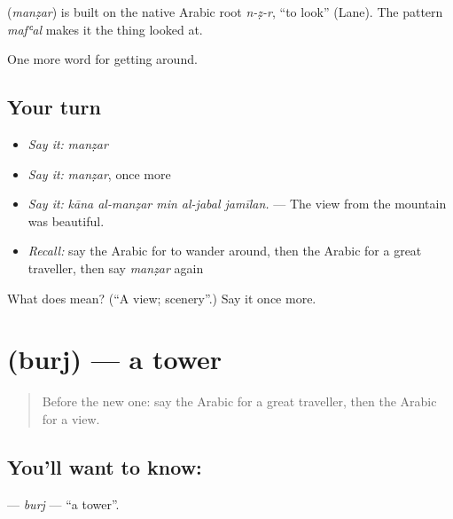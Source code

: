 \begin{cousinweb}
\textbf{} (\emph{manẓar}) is built on the native Arabic root \emph{n-ẓ-r}, \textquotedblleft{}to look\textquotedblright{} (Lane). The pattern \emph{mafʿal} makes it the thing looked at.
\end{cousinweb}

\begin{grammarlens}[title={What you've built}]
One more word for getting around.
\end{grammarlens}

\subsection*{Your turn}
\begin{itemize}
\raggedright
  \item \emph{Say it:} \emph{manẓar}
  \item \emph{Say it:} \emph{manẓar}, once more
  \item \emph{Say it:} \emph{kāna al-manẓar min al-jabal jamīlan.} — The view from the mountain was beautiful.
  \item \emph{Recall:} say the Arabic for to wander around, then the Arabic for a great traveller, then say \emph{manẓar} again
\end{itemize}

\begin{tcolorbox}[breakable,colback=teal!4,colframe=teal!35!black,title={Before you move on}]
What does  mean? (\textquotedblleft{}A view; scenery\textquotedblright{}.) Say it once more.
\end{tcolorbox}
\section[\texorpdfstring{\ar{برج} (burj)}{برج (burj)}]{ (burj) — a tower}

\label{lesson:AR-C439-burj}



\begin{quote}
Before the new one: say the Arabic for a great traveller, then the Arabic for a view.
\end{quote}

\subsection*{You'll want to know: }
\textbf{} — \emph{burj} — \textquotedblleft{}a tower\textquotedblright{}.

